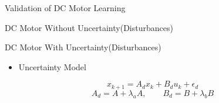 \begin{frame}{Validation of DC Motor Learning}
    \begin{figure}[!tbp]
        \centering
        \centering
    \end{figure}
%     
\end{frame}


\begin{frame}{DC Motor Without Uncertainty(Disturbances)}
    \begin{figure}[!tbp]
        \centering
        \subfloat[GP-MPC controller $t_s=8$]{\label{fig:f1}}
        \centering
        \subfloat[f-MPC controller $t_s=7$]{\label{fig:f1}}
    \end{figure}
%     
\end{frame}


\begin{frame}{DC Motor With Uncertainty(Disturbances)}
\begin{itemize}
        \item Uncertainty Model
    \end{itemize}
     \[ x_{k+1} = A_d x_k + B_d u_k + \epsilon_d \] 
    \[ A_d = A + \lambda_a A, \qquad  B_d = B + \lambda_b B \]  
    \begin{figure}[!tbp]
        \centering
        \subfloat[GP-MPC controller $t_s=11$]{\label{fig:f1}}
        \centering
        \subfloat[f-MPC controller $t_s=9$]{\label{fig:f1}}
    \end{figure}
%     
\end{frame}


